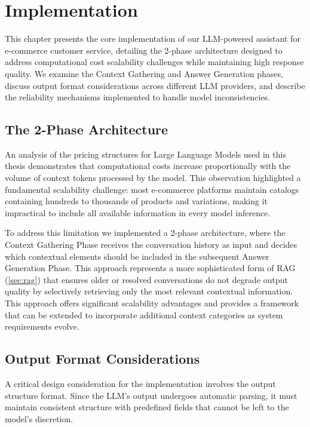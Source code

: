 \chapter{Implementation}
\label{cha:impl}

This chapter presents the core implementation of our LLM-powered assistant for e-commerce customer service, detailing the 2-phase architecture designed to address computational cost scalability challenges while maintaining high response quality.
We examine the Context Gathering and Answer Generation phases, discuss output format considerations across different LLM providers, and describe the reliability mechanisms implemented to handle model inconsistencies.

\section{The 2-Phase Architecture}

An analysis of the pricing structures for Large Language Models used in this thesis \cite{gemini_pricing, anthropic_pricing, openai_pricing} demonstrates that computational costs increase proportionally with the volume of context tokens processed by the model.
This observation highlighted a fundamental scalability challenge: most e-commerce platforms maintain catalogs containing hundreds to thousands of products and variations, making it impractical to include all available information in every model inference.

To address this limitation we implemented a 2-phase architecture, where the Context Gathering Phase receives the conversation history as input and decides which contextual elements should be included in the subsequent Answer Generation Phase.
This approach represents a more sophisticated form of RAG (\cref{sec:rag}) that ensures older or resolved conversations do not degrade output quality by selectively retrieving only the most relevant contextual information.
This approach offers significant scalability advantages and provides a framework that can be extended to incorporate additional context categories as system requirements evolve.

\section{Output Format Considerations}
\label{sec:output_format}

A critical design consideration for the implementation involves the output structure format. Since the LLM's output undergoes automatic parsing, it must maintain consistent structure with predefined fields that cannot be left to the model's discretion.

